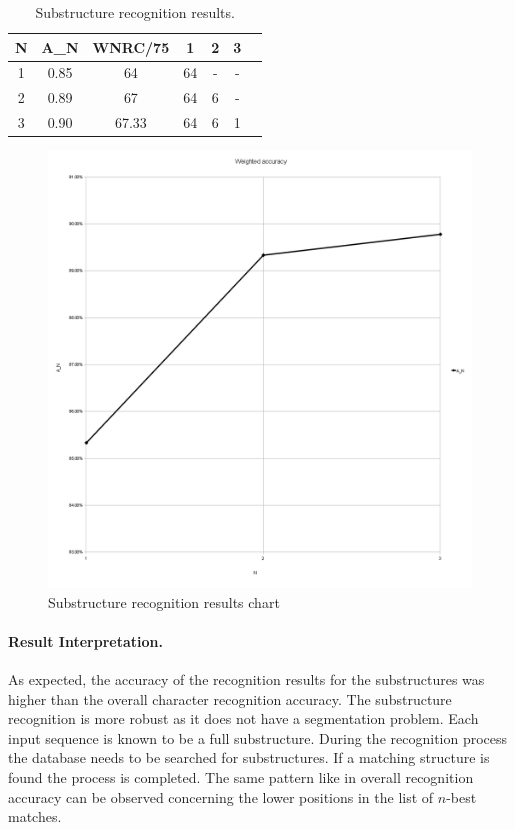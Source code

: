 \begin{table}[htbp]
\begin{center}
  \begin{tabular}{|c|c|c|c|c|c|p{200pt}|}
    \hline
N &  A_N & WNRC/75&  1 & 2 & 3 \\
    \hline
1 & 0.85 & 64     & 64 & - & - \\
    \hline
2 & 0.89 & 67     & 64 & 6 & - \\
    \hline
3 & 0.90 & 67.33  & 64 & 6 & 1 \\
    \hline
  \end{tabular}
\end{center}
\caption{Substructure recognition results.}
\label{table:eval:substructurerecognitionresults}
\end{table}

\begin{figure}[htbp]
  \begin{center}
    \includegraphics[scale=0.5]{images/weightedAccuracySubstructures.png}
    \caption{Substructure recognition results chart}
    \label{fig:eval:substructurerecognitionresults}
  \end{center}
\end{figure}

\paragraph{Result Interpretation.}
As expected, the accuracy of the recognition results for the substructures
was higher than the overall character recognition accuracy.
The substructure recognition is more robust as it does not have a segmentation
problem. Each input sequence is known to be a full substructure. 
During the recognition process the database needs to be searched for 
substructures. If a matching structure is found the process is completed.
The same pattern like in overall recognition accuracy can be observed 
concerning the lower positions in the list of \(n\)-best matches.


